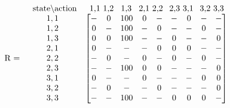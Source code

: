 \documentclass{standalone}
\begin{document}
$
\begin{array}{ccl}
& \text{\hspace{2px} state\textbackslash action} & \text{\hspace{2px} 1,1 1,2 \hspace{2px} 1,3 \hspace{2px} 2,1 2,2 \hspace{1px} 2,3 3,1 \hspace{1px} 3,2 3,3} \\
\text{R =} &
\begin{array}{c}
    1,1 \\
    1,2 \\
    1,3 \\
    2,1 \\
    2,2 \\
    2,3 \\
    3,1 \\
    3,2 \\
    3,3
\end{array} &
\begin{bmatrix}
    - & 0 & 100 & 0 & - & - & 0 & - & - \\
    0 & - & 100 & - & 0 & - & - & 0 & - \\
    0 & 0 & 100 & - & - & 0 & - & - & 0 \\
    0 & - & -   & - & 0 & 0 & 0 & - & - \\
    - & 0 & -   & 0 & - & 0 & - & 0 & - \\
    - & - & 100 & 0 & 0 & - & - & - & 0 \\
    0 & - & -   & 0 & - & - & - & 0 & 0 \\
    - & 0 & -   & - & 0 & - & - & - & 0 \\
    - & - & 100 & - & - & 0 & 0 & 0 & - \\
\end{bmatrix}
\end{array}
$
\end{document}
